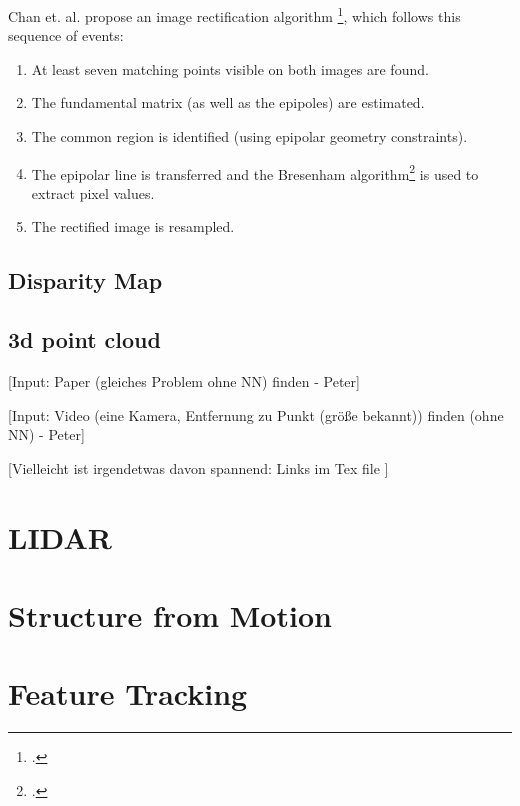 Chan et. al. propose an image rectification algorithm \footcite{Chen_New_Image_Rectification_Algorithm}, which follows this sequence of events:

\begin{enumerate}
	\item At least seven matching points visible on both images are found.
	\item The fundamental matrix (as well as the epipoles) are estimated.
	\item The common region is identified (using epipolar geometry constraints).
	\item The epipolar line is transferred and the Bresenham algorithm\footcite{Bresenham_Linear_Algorithm_For_Incremental_Digital_Display_Of_Circular_Arcs} is used to extract pixel values.
	\item The rectified image is resampled.
\end{enumerate}

\subsection{Disparity Map}

\subsection{3d point cloud}


[Input: Paper (gleiches Problem ohne NN) finden - Peter]

[Input: Video (eine Kamera, Entfernung zu Punkt (größe bekannt)) finden (ohne NN) - Peter]


[Vielleicht ist irgendetwas davon spannend:
Links im Tex file
]

\section{LIDAR}

\section{Structure from Motion}

\section{Feature Tracking}


\filbreak
